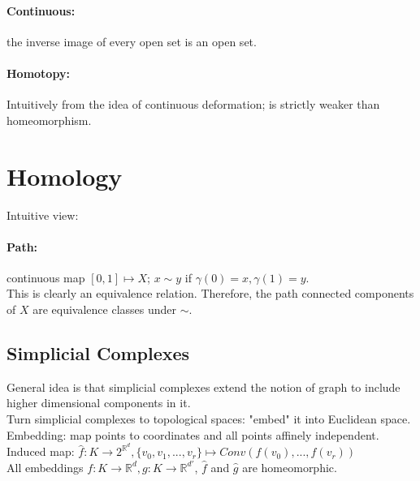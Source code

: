 \documentclass[10pt,a4paper]{report}
\begin{document}
\paragraph{Continuous:}the inverse image of every open set is an open set.

\paragraph{Homotopy:}
Intuitively from the idea of continuous deformation; is strictly weaker than homeomorphism.

\section{Homology}
Intuitive view:\\
\paragraph{Path:} continuous map $[0,1]\mapsto X$; $x\sim y$ if $\gamma(0)=x,\gamma(1)=y$.\\
This is clearly an equivalence relation. Therefore, the path connected components of $X$ are equivalence classes under $\sim$.
\subsection{Simplicial Complexes}
General idea is that simplicial complexes extend the notion of graph to include higher dimensional components in it.\\
Turn simplicial complexes to topological spaces: "embed" it into Euclidean space.\\
Embedding: map points to coordinates and all points affinely independent.\\
Induced map: $\hat{f}:K\to 2^{\mathbb{R}^d},\{ v_0,v_1,...,v_r\}\mapsto Conv(f(v_0),...,f(v_r))$\\
All embeddings $f:K\to\mathbb{R}^d,g:K\to\mathbb{R}^{d'}$, $\hat{f}$ and $\hat{g}$ are homeomorphic.
\end{document}
